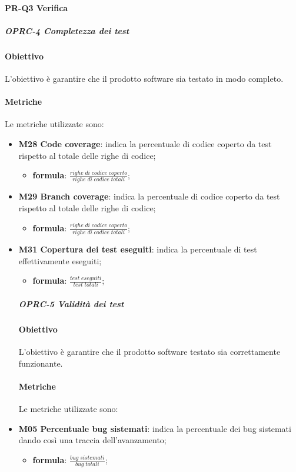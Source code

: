 	\paragraph{PR-Q3 Verifica}
		\subparagraph{OPRC-4 Completezza dei test}
		\paragraph*{Obiettivo}
		L'obiettivo è garantire che il prodotto software sia testato in modo completo.
		\paragraph*{Metriche}
		Le metriche utilizzate sono:
		\begin{itemize}
			\item \textbf{M28 Code coverage}: indica la percentuale di codice coperto da test rispetto al totale delle righe di codice;
			\begin{itemize}
				\item[] \textbf{formula}: $\frac{righe \; di \; codice \; coperto}{righe \; di \; codice \; totali}$;
			\end{itemize} 
		
			\item \textbf{M29 Branch coverage}: indica la percentuale di codice coperto da test rispetto al totale delle righe di codice;
			\begin{itemize}
				\item[] \textbf{formula}: $\frac{righe \; di \; codice \; coperto}{righe \; di \; codice \; totali}$;
			\end{itemize} 
		
			\item \textbf{M31 Copertura dei test eseguiti}: indica la percentuale di test effettivamente eseguiti;
			\begin{itemize}
				\item[] \textbf{formula}: $\frac{test \; eseguiti}{test \; totali}$;
			\end{itemize} 
		\subparagraph{OPRC-5 Validità dei test}
		\paragraph*{Obiettivo}
		L'obiettivo è garantire che il prodotto software testato sia correttamente funzionante.
		\paragraph*{Metriche}
		Le metriche utilizzate sono:
			\item \textbf{M05 Percentuale bug sistemati}: indica la percentuale dei bug sistemati dando così una traccia dell'avanzamento;
			\begin{itemize}
				\item[] \textbf{formula}: $\frac{bug \; sistemati}{bug \; totali}$;
			\end{itemize} 

\end{itemize}
